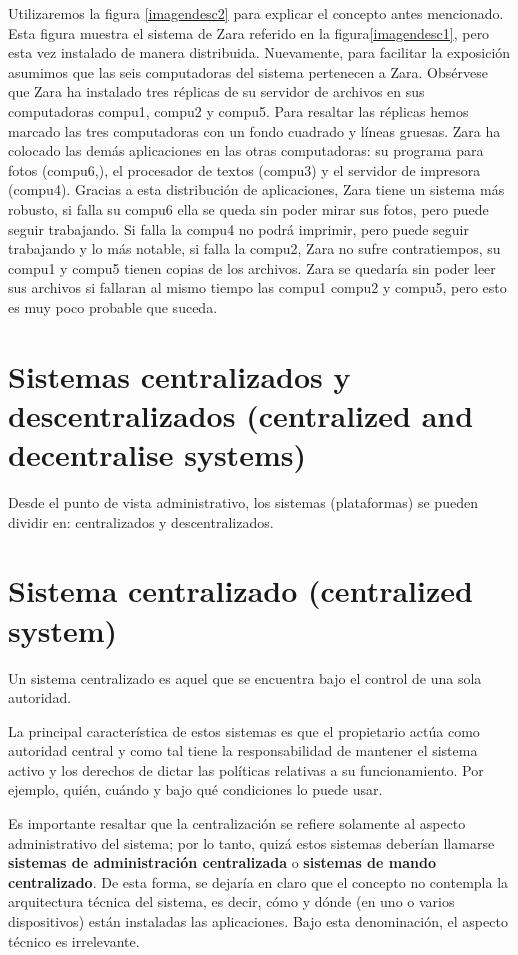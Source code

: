 \documentclass[12pt]{report} %
\begin{document}
Utilizaremos la figura \ref{imagendesc2} para explicar el concepto antes mencionado. Esta figura muestra el sistema de Zara referido en la figura\ref{imagendesc1}, pero esta vez instalado de manera distribuida. Nuevamente, para facilitar la exposición asumimos que las seis computadoras del sistema pertenecen a Zara. Obsérvese que Zara ha instalado tres réplicas de su servidor de archivos en sus computadoras compu1, compu2 y compu5. Para resaltar las réplicas hemos marcado las tres computadoras con un fondo cuadrado y líneas gruesas. Zara ha colocado las demás aplicaciones en las otras computadoras: su programa para fotos (compu6,), el procesador de textos (compu3) y el servidor de impresora (compu4). Gracias a esta distribución de aplicaciones, Zara tiene un sistema más robusto, si falla su compu6 ella se queda sin poder mirar sus fotos, pero puede seguir trabajando. Si falla la compu4 no podrá imprimir, pero puede seguir trabajando y lo más notable, si falla la compu2, Zara no sufre contratiempos, su compu1 y compu5 tienen copias de los archivos. Zara se quedaría sin poder leer sus archivos si fallaran al mismo tiempo las compu1 compu2 y compu5, pero esto es muy poco probable que suceda. 

\section{Sistemas centralizados y descentralizados \textbf{(centralized and decentralise systems)}}

Desde el punto de vista administrativo, los sistemas (plataformas) se pueden dividir en: centralizados y descentralizados.

\section{Sistema centralizado (centralized system)}

Un sistema centralizado es aquel que se encuentra bajo el control de una sola autoridad.

La principal característica de estos sistemas es que el propietario actúa como autoridad central y como tal tiene la responsabilidad de mantener el sistema activo y los derechos de dictar las políticas relativas a su funcionamiento. Por ejemplo, quién, cuándo y bajo qué condiciones lo puede usar.

Es importante resaltar que la centralización se refiere solamente al aspecto administrativo del sistema; por lo tanto, quizá estos sistemas deberían llamarse \textbf{sistemas de administración centralizada} o \textbf{sistemas de mando centralizado}. De esta forma, se dejaría en claro que el concepto no contempla la arquitectura técnica del sistema, es decir, cómo y dónde (en uno o varios dispositivos) están instaladas las aplicaciones. Bajo esta denominación, el aspecto técnico es irrelevante. 
\end{document}
